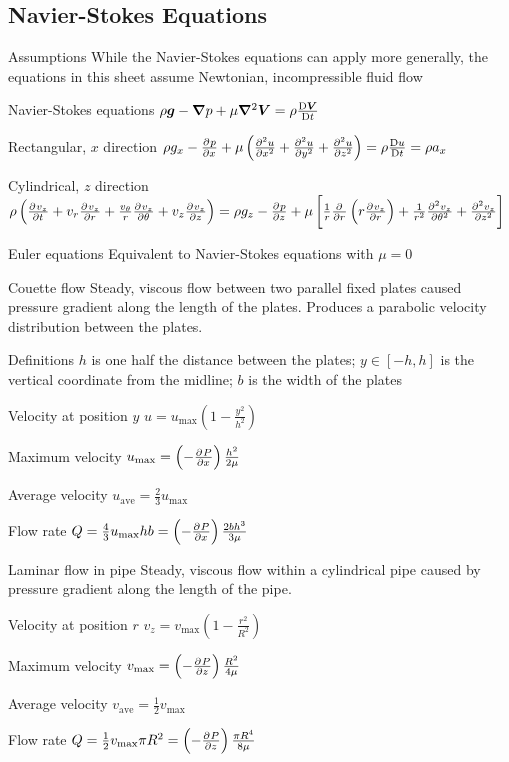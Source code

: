 \documentclass{article}
\begin{document}
\subsection{Navier-Stokes Equations}
\begin{description*}
\item[Assumptions] While the Navier-Stokes equations can apply more generally, the equations in this
  sheet assume Newtonian, incompressible fluid flow
\item[Navier-Stokes equations]
  \(\rho\vec{g} - \del p + \mu\del^2\vec{V} = \rho\frac{\Dif\vec V}{\Dif t}\)
  \begin{description*}
  \item[Rectangular, $x$ direction]
    \(\rho g_x - \pd{p}{x} + \mu\left(\pd[2]{u}{x}+\pd[2]{u}{y}+\pd[2]{u}{z}\right)
    = \rho\frac{\Dif u}{\Dif t} = \rho a_x\)
  \item[Cylindrical, $z$ direction]
    \(\rho\left(\pd{v_z}{t}+v_r\pd{v_z}{r}+\frac{v_\theta}{r}\pd{v_z}{\theta}+v_z\pd{v_z}{z}\right)
    = \rho g_z - \pd{p}{z}
    + \mu\left[\frac{1}{r}\pd{}{r}\left(r\pd{v_z}{r}\right)
      + \frac{1}{r^2}\pd[2]{v_z}{\theta}
      + \pd[2]{v_z}{z}\right]\)
  \end{description*}
\item[Euler equations] Equivalent to Navier-Stokes equations with $\mu=0$
\item[Couette flow] Steady, viscous flow between two parallel fixed plates caused pressure gradient
  along the length of the plates. Produces a parabolic velocity distribution between the plates.
  \begin{description*}
  \item[Definitions] $h$ is one half the distance between the plates;
    $y\in[-h,h]$ is the vertical coordinate from the midline;
    $b$ is the width of the plates
  \item[Velocity at position $y$]
    \(u = u_\mathrm{max}\left(1-\frac{y^2}{h^2}\right)\)
  \item[Maximum velocity]
    \(u_\mathrm{max} = \left(-\pd{P}{x}\right)\frac{h^2}{2\mu}\)
  \item[Average velocity]
    \(u_\mathrm{ave} = \frac{2}{3}u_\mathrm{max}\)
  \item[Flow rate]
    \(Q = \frac{4}{3}u_\mathrm{max}hb = \left(-\pd{P}{x}\right)\frac{2bh^3}{3\mu}\)
  \end{description*}
\item[Laminar flow in pipe] Steady, viscous flow within a cylindrical pipe caused by pressure
  gradient along the length of the pipe.
  \begin{description*}
  \item[Velocity at position $r$]
    \(v_z = v_\mathrm{max}\left(1 - \frac{r^2}{R^2}\right)\)
  \item[Maximum velocity]
    \(v_\mathrm{max} = \left(-\pd{P}{z}\right)\frac{R^2}{4\mu}\)
  \item[Average velocity]
    \(v_\mathrm{ave} = \frac{1}{2}v_\mathrm{max}\)
  \item[Flow rate]
    \(Q = \frac{1}{2}v_\mathrm{max}\pi R^2 = \left(-\pd{P}{z}\right)\frac{\pi R^4}{8\mu}\)
  \end{description*}
\end{description*}
\end{document}
